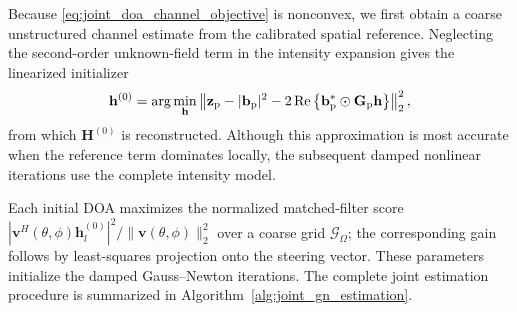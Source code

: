 \documentclass[journal]{IEEEtran}
\begin{document}
Because \eqref{eq:joint_doa_channel_objective} is nonconvex, we first obtain a
coarse unstructured channel estimate from the calibrated spatial reference.
Neglecting the second-order unknown-field term in the intensity expansion gives
the linearized initializer
\begin{equation}
\mathbf{h}^{(0)}
=
\arg\min_{\mathbf{h}}
\left\|
\mathbf{z}_{\rm p}
-
|\mathbf{b}_{\rm p}|^2
-
2\operatorname{Re}
\left\{
\mathbf{b}_{\rm p}^{*}
\odot
\mathbf{G}_{\rm p}\mathbf{h}
\right\}
\right\|_2^2,
\label{eq:linearized_channel_initialization}
\end{equation}
from which $\mathbf{H}^{(0)}$ is reconstructed. Although this approximation is
most accurate when the reference term dominates locally, the subsequent
damped nonlinear iterations use the complete intensity model.

Each initial DOA maximizes the normalized matched-filter score
$|\mathbf v^H(\theta,\phi)\mathbf h_l^{(0)}|^2/
\|\mathbf v(\theta,\phi)\|_2^2$ over a coarse grid
$\mathcal G_\Omega$; the corresponding gain follows by least-squares
projection onto the steering vector. These parameters initialize the damped
Gauss--Newton iterations.
The complete joint estimation procedure is summarized in Algorithm~\ref{alg:joint_gn_estimation}.
\end{document}
